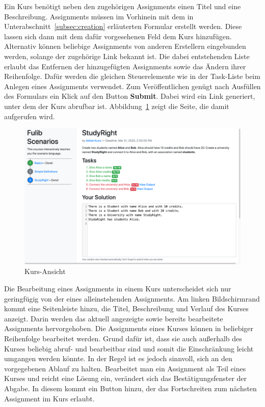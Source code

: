 Ein Kurs benötigt neben den zugehörigen Assignments einen Titel und eine Beschreibung.
Assignments müssen im Vorhinein mit dem in Unterabschnitt~\ref{subsec:creation} erläuterten Formular erstellt werden.
Diese lassen sich dann mit dem dafür vorgesehenen Feld dem Kurs hinzufügen.
Alternativ können beliebige Assignments von anderen Erstellern eingebunden werden, solange der zugehörige Link bekannt ist.
Die dabei entstehenden Liste erlaubt das Entfernen der hinzugefügten Assignments sowie das Ändern ihrer Reihenfolge.
Dafür werden die gleichen Steuerelemente wie in der Task-Liste beim Anlegen eines Assignments verwendet.
Zum Veröffentlichen genügt nach Ausfüllen des Formulars ein Klick auf den Button \textbf{Submit}.
Dabei wird ein Link generiert, unter dem der Kurs abrufbar ist.
Abbildung~\ref{fig:course-view} zeigt die Seite, die damit aufgerufen wird.

\begin{figure}
    \centering
    \includegraphics[width=\textwidth]{chapter/fulib.org/img/course-view.png}
    \caption{Kurs-Ansicht}
    \label{fig:course-view}
\end{figure}

Die Bearbeitung eines Assignments in einem Kurs unterscheidet sich nur geringfügig von der eines alleinstehenden Assignments.
Am linken Bildschirmrand kommt eine Seitenleiste hinzu, die Titel, Beschreibung und Verlauf des Kurses anzeigt.
Darin werden das aktuell angezeigte sowie bereits bearbeitete Assignments hervorgehoben.
Die Assignments eines Kurses können in beliebiger Reihenfolge bearbeitet werden.
Grund dafür ist, dass sie auch außerhalb des Kurses beliebig abruf- und bearbeitbar sind und somit die Einschränkung leicht umgangen werden könnte.
In der Regel ist es jedoch sinnvoll, sich an den vorgegebenen Ablauf zu halten.
Bearbeitet man ein Assignment als Teil eines Kurses und reicht eine Lösung ein, verändert sich das Bestätigungsfenster der Abgabe.
In diesem kommt ein Button hinzu, der das Fortschreiten zum nächsten Assignment im Kurs erlaubt.

